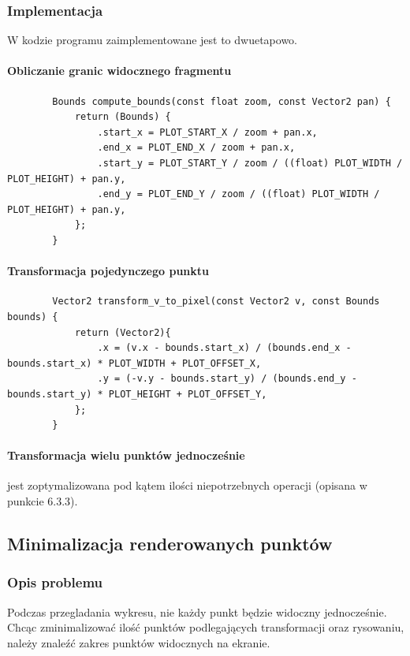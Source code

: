 \documentclass{article}
\begin{document}
	\subsubsection{Implementacja}
	W kodzie programu zaimplementowane jest to dwuetapowo.
	\paragraph{Obliczanie granic widocznego fragmentu}
	\begin{verbatim}
		Bounds compute_bounds(const float zoom, const Vector2 pan) {
			return (Bounds) {
				.start_x = PLOT_START_X / zoom + pan.x,
				.end_x = PLOT_END_X / zoom + pan.x,
				.start_y = PLOT_START_Y / zoom / ((float) PLOT_WIDTH / PLOT_HEIGHT) + pan.y,
				.end_y = PLOT_END_Y / zoom / ((float) PLOT_WIDTH / PLOT_HEIGHT) + pan.y,
			};
		}
	\end{verbatim}
	
	\paragraph{Transformacja pojedynczego punktu}
	\begin{verbatim}
		Vector2 transform_v_to_pixel(const Vector2 v, const Bounds bounds) {
			return (Vector2){
				.x = (v.x - bounds.start_x) / (bounds.end_x - bounds.start_x) * PLOT_WIDTH + PLOT_OFFSET_X,
				.y = (-v.y - bounds.start_y) / (bounds.end_y - bounds.start_y) * PLOT_HEIGHT + PLOT_OFFSET_Y,
			};
		}
	\end{verbatim}
	
	\paragraph{Transformacja wielu punktów jednocześnie} jest zoptymalizowana pod kątem ilości niepotrzebnych operacji (opisana w punkcie 6.3.3).
	
	\subsection{Minimalizacja renderowanych punktów}
	\subsubsection{Opis problemu}
	Podczas przegladania wykresu, nie każdy punkt będzie widoczny jednocześnie. Chcąc zminimalizować ilość punktów podlegających transformacji oraz rysowaniu, należy znaleźć zakres punktów widocznych na ekranie.
	
\end{document}
